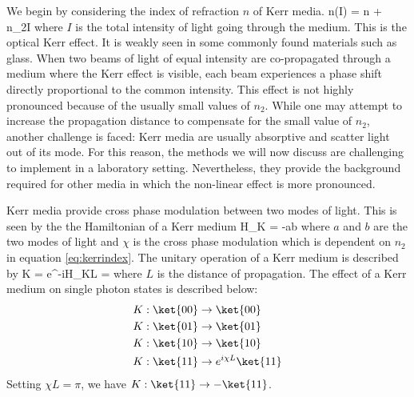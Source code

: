 We begin by considering the index of refraction $n$ of Kerr media.
\beq
\label{eq:kerrindex}
n(I) = n + n_2I
\eeq
where $I$ is the total intensity of light going through the medium. This is the optical Kerr effect. It is weakly seen in some commonly found materials such as glass. When two beams of light of equal intensity are co-propagated through a medium where the Kerr effect is visible, each beam experiences a phase shift directly proportional to the common intensity. This effect is not highly pronounced because of the usually small values of $n_2$. While one may attempt to increase the propagation distance to compensate for the small value of $n_2$, another challenge is faced: Kerr media are usually absorptive and scatter light out of its mode. For this reason, the methods we will now discuss are challenging to implement in a laboratory setting. Nevertheless, they provide the background required for other media in which the non-linear effect  is more pronounced.

Kerr media provide cross phase modulation between two modes of light. This is seen by the the Hamiltonian of a Kerr medium
\beq
H_K = -\chi{}ab
\eeq
where $a$ and $b$ are the two modes of light and $\chi$ is the cross phase modulation which is dependent on $n_2$ in equation \eqref{eq:kerrindex}. The unitary operation of a Kerr medium is described by
\beq
K = e^{-iH_KL} = 
\eeq
where $L$ is the distance of propagation. The effect of a Kerr medium on single photon states is described below:
\begin{align}
K:\ket{00}&\rightarrow\ket{00}\\
K:\ket{01}&\rightarrow\ket{01}\\
K:\ket{10}&\rightarrow\ket{10}\\
K:\ket{11}&\rightarrow e^{i\chi L}\ket{11}
\end{align}
Setting $\chi L = \pi$, we have $K:\ket{11}\rightarrow -\ket{11}$. 

